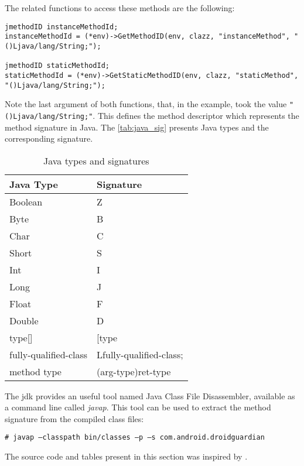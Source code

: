 The related functions to access these methods are the following:

\begin{lstlisting}[caption=Acessing Java methods]
jmethodID instanceMethodId;
instanceMethodId = (*env)->GetMethodID(env, clazz, "instanceMethod", "()Ljava/lang/String;");

jmethodID staticMethodId;
staticMethodId = (*env)->GetStaticMethodID(env, clazz, "staticMethod", "()Ljava/lang/String;");
\end{lstlisting}

Note the last argument of both functions, that, in the example, took the value \texttt{"()Ljava/lang/String;"}. This defines the method descriptor which represents the method signature in Java. The \autoref{tab:java_sig} presents Java types and the corresponding signature.

\begin{table}[h]
\begin{center}
\begin{tabular}{| l | l |}
\hline
\textbf{Java Type} & \textbf{Signature}\\
\hline
Boolean & Z\\
\hline
Byte & B\\
\hline
Char & C\\
\hline
Short & S\\
\hline
Int & I\\
\hline
Long & J\\
\hline
Float & F\\
\hline
Double & D\\
\hline
type[] & [type\\
\hline
fully-qualified-class & Lfully-qualified-class;\\
\hline
method type & (arg-type)ret-type\\
\hline
\end{tabular}
\end{center}
\caption{Java types and signatures}
\label{tab:java_sig}
\end{table}

The \gls{jdk} provides an useful tool named Java Class File Disassembler, available as a command line called \textit{javap}. This tool can be used to extract the method signature from the compiled class files:

\begin{lstlisting}[caption=Example of use of the javap tool]
# javap –classpath bin/classes –p –s com.android.droidguardian
\end{lstlisting}

The source code and tables present in this section was inspired by \cite{AndroidNDK:Apress}.